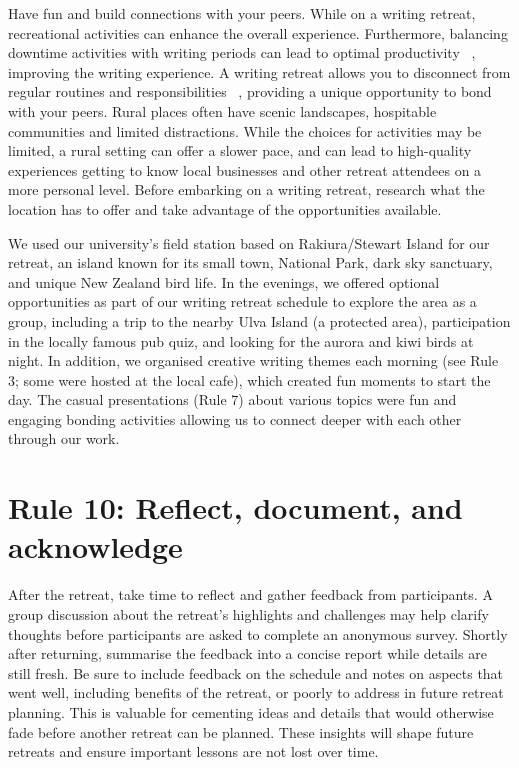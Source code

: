 \documentclass[10pt,letterpaper]{article}
\begin{document}
Have fun and build connections with your peers. While on a writing retreat, recreational activities can enhance the overall experience. Furthermore, balancing downtime activities with writing periods can lead to optimal productivity ~\cite{eardley2021, lyubykh2022}, improving the writing experience. A writing retreat allows you to disconnect from regular routines and responsibilities ~\cite{murray2013}, providing a unique opportunity to bond with your peers. Rural places often have scenic landscapes, hospitable communities and limited distractions. While the choices for activities may be limited, a rural setting can offer a slower pace, and can lead to high-quality experiences getting to know local businesses and other retreat attendees on a more personal level. Before embarking on a writing retreat, research what the location has to offer and take advantage of the opportunities available. 

We used our university's field station based on Rakiura/Stewart Island for our retreat, an island known for its small town, National Park, dark sky sanctuary, and unique New Zealand bird life. In the evenings, we offered optional opportunities as part of our writing retreat schedule to explore the area as a group, including a trip to the nearby Ulva Island (a protected area), participation in the locally famous pub quiz, and looking for the aurora and kiwi birds at night. In addition, we organised creative writing themes each morning (see Rule 3; some were hosted at the local cafe), which created fun moments to start the day. The casual presentations (Rule 7) about various topics were fun and engaging bonding activities allowing us to connect deeper with each other through our work.

\section*{Rule 10: Reflect, document, and acknowledge}

After the retreat, take time to reflect and gather feedback from participants. A group discussion about the retreat's highlights and challenges may help clarify thoughts before participants are asked to complete an anonymous survey. Shortly after returning, summarise the feedback into a concise report while details are still fresh. Be sure to include feedback on the schedule and notes on aspects that went well, including benefits of the retreat, or poorly to address in future retreat planning. This is valuable for cementing ideas and details that would otherwise fade before another retreat can be planned. These insights will shape future retreats and ensure important lessons are not lost over time.
\end{document}
